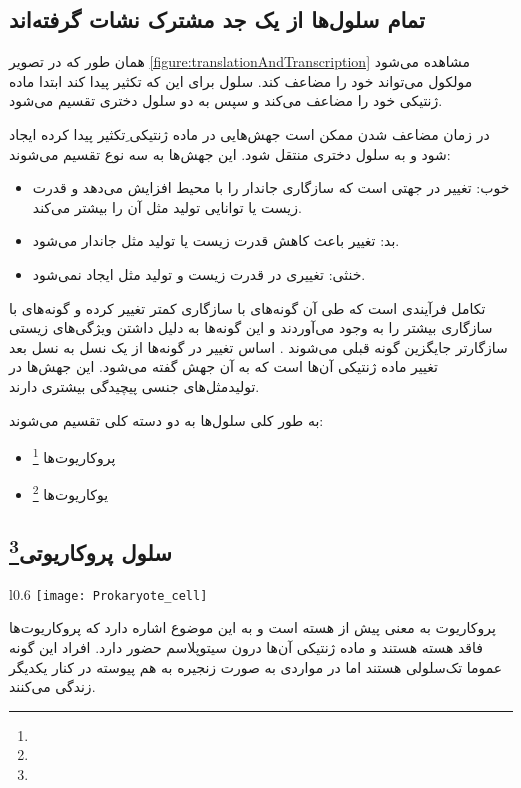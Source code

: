 \subsection{تمام سلول‌ها از یک جد مشترک نشات گرفته‌اند}

همان طور که در تصویر
\ref{figure:translationAndTranscription}
مشاهده می‌شود مولکول
می‌تواند خود را مضاعف کند. سلول برای این که تکثیر پیدا کند ابتدا ماده ژنتیکی خود را مضاعف می‌کند و سپس به دو سلول دختری تقسیم می‌شود.

\noindent
در زمان مضاعف شدن ممکن است جهش‌هایی در ماده ژنتیکی ِتکثیر پیدا کرده ایجاد شود و به سلول دختری منتقل شود. این جهش‌ها به سه نوع تقسیم می‌شوند:

\begin{itemize}
\item خوب:
تغییر در جهتی است که سازگاری جاندار را با محیط افزایش می‌دهد و قدرت زیست  یا توانایی تولید مثل آن را بیشتر می‌کند.
\item بد:
تغییر باعث کاهش قدرت زیست یا تولید مثل جاندار می‌شود.
\item خنثی:
تغییری در قدرت زیست و تولید مثل ایجاد نمی‌شود.
\end{itemize}

تکامل فرآیندی است که طی آن گونه‌های با سازگاری کمتر تغییر کرده و گونه‌های با سازگاری بیشتر را به وجود می‌آوردند و این گونه‌ها به دلیل داشتن ویژگی‌های زیستی سازگارتر جایگزین گونه قبلی می‌شوند .
اساس تغییر در گونه‌ها از یک نسل به نسل بعد تغییر ماده ژنتیکی آن‌ها است  که به آن جهش گفته می‌شود. این جهش‌ها در تولید‌مثل‌های جنسی پیچیدگی بیشتری دارند.

\bigskip
به طور کلی سلول‌ها به دو دسته کلی تقسیم می‌شوند:
\begin{itemize}
\item پروکاریوت‌ها 
\footnote{}
\item یوکاریوت‌ها
\footnote{}
\end{itemize}

\subsection{سلول پروکاریوتی\protect\footnote{}}

\begin{wrapfigure}[17]{l}{0.6\textwidth}
	\centering
	\texttt{[image: Prokaryote\_cell]}
\end{wrapfigure}

پروکاریوت به معنی پیش از هسته است و به این موضوع اشاره دارد که پروکاریوت‌ها فاقد هسته هستند و ماده ژنتیکی آن‌ها درون سیتوپلاسم حضور دارد. افراد این گونه عموما تک‌سلولی هستند اما در مواردی به صورت زنجیره به هم پیوسته در کنار یکدیگر زندگی می‌کنند. 

